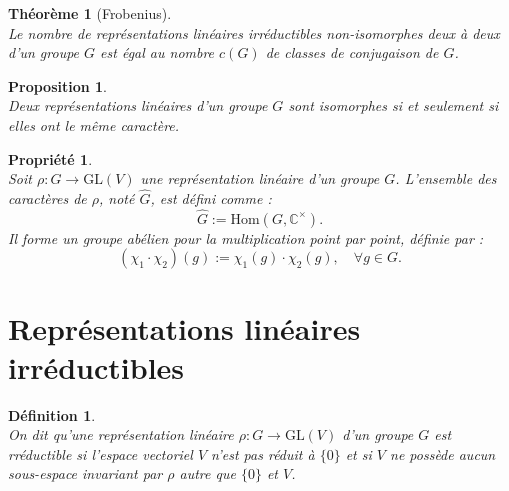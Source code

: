 \documentclass[a4paper, 14pt]{report}
\newtheorem{definition}{Définition}[section]
\newtheorem{proposition}{Proposition}[section]
\newtheorem{propriety}{Propriété}[section]
\newtheorem{theorem}{Théorème}[section]
\begin{document}
\begin{onehalfspace}
{\begin{theorem}[Frobenius] \cite{serre1971representation} \\
Le nombre de représentations linéaires irréductibles non-isomorphes deux à deux d'un groupe \( G \) est égal au nombre \( c(G) \) de classes de conjugaison de \( G \).
\end{theorem}


\begin{proposition} \cite{renard2009groupes}\\
Deux représentations linéaires d’un groupe \( G \) sont isomorphes si et seulement si elles ont le même caractère.
\end{proposition}

\begin{propriety} \cite{renard2009groupes} \label{proprica}\\
Soit \( \rho : G \rightarrow \mathrm{GL}(V) \) une représentation linéaire d'un groupe \(G\). L’ensemble des caractères de \( \rho \), noté \( \widehat{G} \), est défini comme :
	\[
	\widehat{G} := \mathrm{Hom}(G, \mathbb{C}^\times).
	\]
	Il forme un groupe abélien pour la multiplication point par point, définie par :
	\[
	(\chi_1 \cdot \chi_2)(g) := \chi_1(g) \cdot \chi_2(g), \quad \forall g \in G.
	\]
\end{propriety}

\section{Représentations linéaires irréductibles}
\begin{definition}  \cite{serre1971representation} \\
On dit qu'une représentation linéaire \( \rho : G \rightarrow \mathrm{GL}(V) \) d'un groupe \(G\) est rréductible si l'espace vectoriel \( V \) n'est pas réduit à \( \{0\} \) et si \( V \) ne possède aucun sous-espace invariant par \( \rho \) autre que \( \{0\} \) et \( V \).	
\end{definition}

}
\end{onehalfspace}
\end{document}
